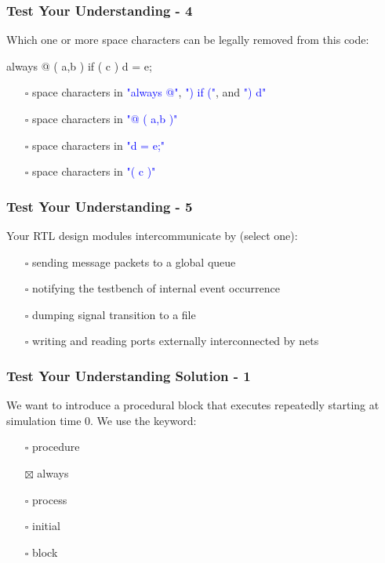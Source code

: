 \documentclass[t, notes]{beamer}
\begin{document}
\begin{frame}
\frametitle{Test Your Understanding - 4}

Which one or more space characters can be legally removed from this code:

always @ ( a,b ) if ( c ) d = e;
\newline
\begin{itemize}
\item[$\square$] space characters in \textcolor{blue}{"always @"}, \textcolor{blue}{") if ("}, and \textcolor{blue}{") d"}
\item[$\square$] space characters in \textcolor{blue}{"@ ( a,b )"}
\item[$\square$] space characters in \textcolor{blue}{"d = e;"}
\item[$\square$] space characters in \textcolor{blue}{"( c )"}
\end{itemize}

\end{frame}

\begin{frame}
\frametitle{Test Your Understanding - 5}

Your RTL design modules intercommunicate by (select one):
\begin{itemize}
\item[$\square$] sending message packets to a global queue
\item[$\square$] notifying the testbench of internal event occurrence
\item[$\square$] dumping signal transition to a file
\item[$\square$] writing and reading ports externally interconnected by nets
\end{itemize}

\end{frame}

\begin{frame}
\frametitle{Test Your Understanding Solution - 1}

We want to introduce a procedural block that executes repeatedly starting at simulation time 0. We use the keyword:
\begin{itemize}
\item[$\square$] procedure
\item[$\boxtimes$] always
\item[$\square$] process
\item[$\square$] initial
\item[$\square$] block
\end{itemize}

\end{frame}
\end{document}
